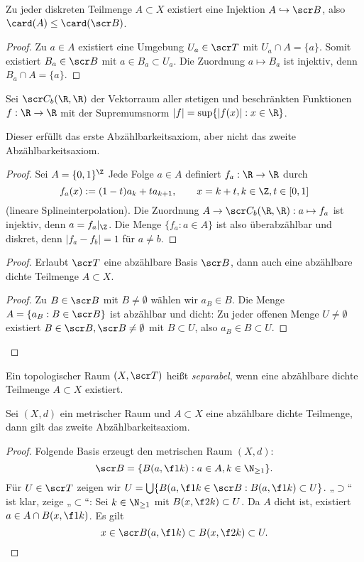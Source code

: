 \begin{lem}
	Zu jeder diskreten Teilmenge $A \subset X$ existiert eine Injektion $A \injto \scr B$, also $\card (A) \le \card(\scr B)$.
	\begin{proof}
		Zu $a \in A$ existiert eine Umgebung $U_a \in \scr T$ mit $U_a \cap A = \{a\}$.
		Somit existiert $B_a \in \scr B$ mit $a \in B_a \subset U_a$.
		Die Zuordnung $a \mapsto B_a$ ist injektiv, denn $B_a \cap A = \{a\}$.
	\end{proof}
\end{lem}

\begin{st}
	Sei $\scr C_b(\R, \R)$ der Vektorraum aller stetigen und beschränkten Funktionen $f: \R \to \R$ mit der Supremumsnorm $|f| = \sup \{|f(x)| : x \in \R \}$.

	Dieser erfüllt das erste Abzählbarkeitsaxiom, aber nicht das zweite Abzählbarkeitsaxiom.
	\begin{proof}
		Sei $A = \{0, 1\}^\Z$ %
		Jede Folge $a \in A$ definiert $f_a : \R \to \R$ durch
		\[
			f_a(x)
			:= (1-t)a_k + t a_{k+1},
			\qquad x = k+t, k \in \Z, t \in [0,1]
		\]
		(lineare Splineinterpolation).
		Die Zuordnung $A \to \scr C_b (\R, \R) : a \mapsto f_a$ ist injektiv, denn $a = f_a|_\Z$.
		Die Menge $\{f_a : a \in A\}$ ist also überabzählbar und diskret, denn $|f_a - f_b| = 1$ für $a\neq b$.
	\end{proof}
\end{st}

\begin{proof}
	Erlaubt $\scr T$ eine abzählbare Basis $\scr B$, dann auch eine abzählbare dichte Teilmenge $A \subset X$.
	\begin{proof}
		Zu $B \in \scr B$ mit $B \neq \emptyset$ wählen wir $a_B \in B$.
		Die Menge $A = \{a_B : B \in \scr B\}$ ist abzählbar und dicht:
		Zu jeder offenen Menge $U \neq \emptyset$ existiert $B \in \scr B, \scr B \neq \emptyset$ mit $B \subset U$, also $a_B \in B \subset U$.
	\end{proof}
\end{proof}

\begin{df}
	Ein topologischer Raum $(X, \scr T)$ heißt \emph{separabel}, wenn eine abzählbare dichte Teilmenge $A \subset X$ existiert.
\end{df}

\begin{st}
	Sei $(X,d)$ ein metrischer Raum und $A \subset X$ eine abzählbare dichte Teilmenge, dann gilt das zweite Abzählbarkeitsaxiom.
	\begin{proof}
		Folgende Basis erzeugt den metrischen Raum $(X,d)$:
		\[
			\scr B = \{ B(a, \f 1k) : a \in A, k \in \N_{\ge 1} \}.
		\]
		Für $U \in \scr T$ zeigen wir $U = \bigcup \{ B(a, \f 1k \in \scr B : B(a, \f 1k) \subset U \}$.
		„$\supset$“ ist klar, zeige „$\subset$“:
		Sei $k \in \N_{\ge 1}$ mit $B(x, \f 2k) \subset U$.
		Da $A$ dicht ist, existiert $a \in A \cap B(x, \f 1k)$.
		Es gilt
		\[
			x \in \scr B(a, \f 1k) \subset B(x, \f 2k) \subset U.
		\]
	\end{proof}
\end{st}

